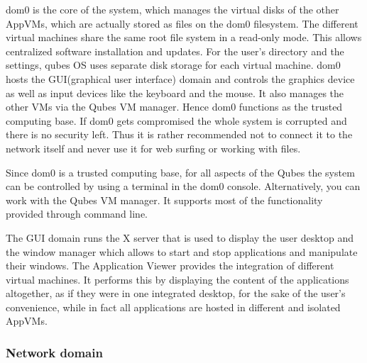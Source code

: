 \documentclass[runningheads,a4paper]{article}
\begin{document}
dom0 is the core of the system, which manages the virtual disks of the
other AppVMs, which are actually stored as files on the dom0
filesystem. The different virtual machines share the same root file
system in a read-only mode. This allows centralized software
installation and updates. For the user's directory and the settings,
qubes OS uses separate disk storage for each virtual machine. 
dom0 hosts the GUI(graphical user interface) domain and controls the
graphics device as well as input devices like the keyboard and the
mouse. It also manages the other VMs via the Qubes VM manager. Hence
dom0 functions as the trusted computing base. If dom0 gets compromised
the whole system is corrupted and there is no security left. Thus it is rather recommended not to connect it to the network itself and never use it for web surfing or working with files.

Since dom0 is a trusted computing base, for all aspects of the Qubes
the system can be controlled by using a terminal in the dom0 console. 
Alternatively, you can work with the Qubes VM
manager. It supports most of the functionality provided through
command line. 

The GUI domain runs the X server that is used to display the user desktop and
the window manager which allows to start and stop applications and
manipulate their windows. The Application Viewer provides the
integration of different virtual machines. It performs this by displaying the
content of the applications altogether, as if they were in one integrated desktop, for
the sake of the user's convenience, while in fact all applications are hosted in different and isolated AppVMs.


\subsubsection{Network domain}
\end{document}
